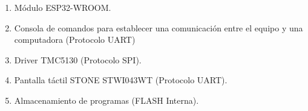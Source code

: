 \begin{enumerate}
\item Módulo ESP32-WROOM. 
\item Consola de comandos para establecer una comunicación entre el equipo y una computadora (Protocolo UART)
\item Driver TMC5130 (Protocolo SPI).
\item Pantalla táctil STONE STWI043WT (Protocolo UART). 
\item Almacenamiento de programas (FLASH Interna).

\end{enumerate}


